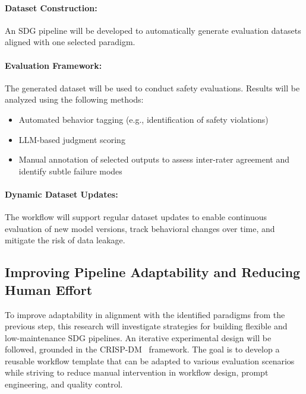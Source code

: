 \documentclass[12pt,a4paper]{article}
\begin{document}
\paragraph{Dataset Construction:} 
An SDG pipeline will be developed to automatically generate evaluation datasets aligned with one selected paradigm.

\paragraph{Evaluation Framework:} 
The generated dataset will be used to conduct safety evaluations. Results will be analyzed using the following methods:
\begin{itemize}
    \item Automated behavior tagging (e.g., identification of safety violations)
    \item LLM-based judgment scoring
    \item Manual annotation of selected outputs to assess inter-rater agreement and identify subtle failure modes
\end{itemize}

\paragraph{Dynamic Dataset Updates:} 
The workflow will support regular dataset updates to enable continuous evaluation of new model versions, track behavioral changes over time, and mitigate the risk of data leakage.

\subsection{Improving Pipeline Adaptability and Reducing Human Effort}
To improve adaptability in alignment with the identified paradigms from the previous step, this research will investigate strategies for building flexible and low-maintenance SDG pipelines. An iterative experimental design will be followed, grounded in the CRISP-DM~\cite{crisp} framework. The goal is to develop a reusable workflow template that can be adapted to various evaluation scenarios while striving to reduce manual intervention in workflow design, prompt engineering, and quality control.
\end{document}
